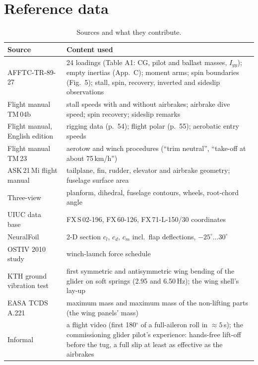 \documentclass[10pt,a4paper,twocolumn]{article}
\begin{document}
\section{Reference data}\label{sec:ref}
\begin{table}[t]
\centering\small
\caption{Sources and what they contribute.}\label{tab:sources}
\begin{tabularx}{\columnwidth}{@{}>{\raggedright\arraybackslash}p{2.2cm}X@{}}
\toprule
Source & Content used \\
\midrule
AFFTC-TR-89-27~\cite{afftc} & 24 loadings (Table A1: CG, pilot and ballast masses, $I_{yy}$); empty inertias (App.~C); moment arms; spin boundaries (Fig.~5); stall, spin, recovery, inverted and sideslip observations \\
Flight manual TM\,04b~\cite{fm04b} & stall speeds with and without airbrakes; airbrake dive speed; spin recovery; sideslip remarks \\
Flight manual, English edition~\cite{fmweb} & rigging data (p.~54); flight polar (p.~55); aerobatic entry speeds \\
Flight manual TM\,23~\cite{fm23} & aerotow and winch procedures (``trim neutral'', ``take-off at about 75\,km/h'') \\
ASK\,21\,Mi flight manual~\cite{mi} & tailplane, fin, rudder, elevator and airbrake geometry; fuselage surface area \\
Three-view~\cite{threeview} & planform, dihedral, fuselage contours, wheels, root-chord angle \\
UIUC data base~\cite{uiuc} & FX\,S\,02-196, FX\,60-126, FX\,71-L-150/30 coordinates \\
NeuralFoil~\cite{neuralfoil} & 2-D section $c_l$, $c_d$, $c_m$ incl.\ flap deflections, $-25^\circ\ldots30^\circ$ \\
OSTIV 2010 study~\cite{gaeb} & winch-launch force schedule \\
KTH ground vibration test~\cite{gvt,eller} & first symmetric and antisymmetric wing bending of the glider on soft springs (2.95 and 6.50\,Hz); the wing shell's lay-up \\
EASA TCDS A.221~\cite{tcds} & maximum mass and maximum mass of the non-lifting parts (the wing panels' mass) \\
Informal & a flight video (first 180$^\circ$ of a full-aileron roll in $\approx5$\,s); the commissioning glider pilot's experience: hands-free lift-off before the tug, a full slip at least as effective as the airbrakes \\
\bottomrule
\end{tabularx}
\end{table}
\end{document}
